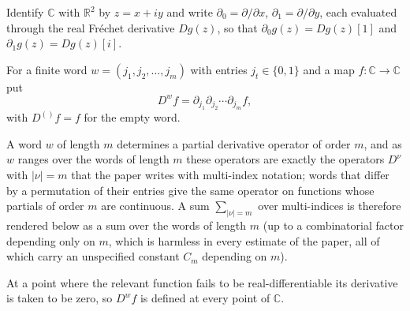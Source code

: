 \begin{definition}
Identify $\mathbb{C}$ with $\mathbb{R}^2$ by $z=x+iy$ and write
$\partial_0=\partial/\partial x$, $\partial_1=\partial/\partial y$, each
evaluated through the real Fr\'echet derivative $Dg(z)$, so that
$\partial_0 g(z)=Dg(z)[1]$ and $\partial_1 g(z)=Dg(z)[i]$.

For a finite word $w=(j_1,j_2,\dots,j_m)$ with entries $j_t\in\{0,1\}$ and a
map $f\colon\mathbb{C}\to\mathbb{C}$ put
\[
  D^w f=\partial_{j_1}\partial_{j_2}\cdots\partial_{j_m}f,
\]
with $D^{()}f=f$ for the empty word.

A word $w$ of length $m$ determines a partial derivative operator of order
$m$, and as $w$ ranges over the words of length $m$ these operators are
exactly the operators $D^\nu$ with $|\nu|=m$ that the paper writes with
multi-index notation; words that differ by a permutation of their entries give
the same operator on functions whose partials of order $m$ are continuous.  A
sum $\sum_{|\nu|=m}$ over multi-indices is therefore rendered below as a sum
over the words of length $m$ (up to a combinatorial factor depending only on
$m$, which is harmless in every estimate of the paper, all of which carry an
unspecified constant $C_m$ depending on $m$).

At a point where the relevant function fails to be
real-differentiable its derivative is taken to be zero, so $D^wf$ is defined
at every point of $\mathbb{C}$.
\end{definition}

